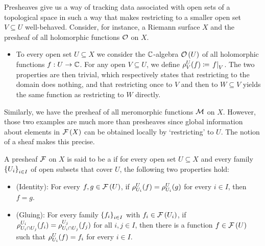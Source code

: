 \documentclass[../Moduli_Spaces_of_Riemann_Surfaces.tex]{subfiles}
\begin{document}
    \begin{remark}
        Presheaves give us a way of tracking data associated with open sets of a topological space in such a way that makes restricting to a smaller open set $V\subseteq U$ well-behaved. Consider, for instance, a Riemann surface $X$ and the presheaf of all holomorphic functions $\mathcal{O}$ on $X$.
        \begin{itemize}
            \item To every open set $U\subseteq X$ we consider the $\mathbb{C}$-algebra $\mathcal{O}\left(U\right)$ of all holomorphic functions $f:U\to\mathbb{C}$. For any open $V\subseteq U$, we define $\rho^U_V\!\left(f\right)\coloneqq\left.f\right|_V$. The two properties are then trivial, which respectively states that restricting to the domain does nothing, and that restricting once to $V$ and then to $W\subseteq V$ yields the same function as restricting to $W$ directly.
        \end{itemize}
        Similarly, we have the presheaf of all meromorphic functions $\mathcal{M}$ on $X$. However, those two examples are much more than presheaves since global information about elements in $\mathcal{F}\left(X\right)$ can be obtained locally by `restricting' to $U$. The notion of a sheaf makes this precise.\exqed
    \end{remark}
    \begin{definition}
        A presheaf $\mathcal{F}$ on $X$ is said to be a  if for every open set $U\subseteq X$ and every family $\left\{U_i\right\}_{i\in I}$ of open subsets that cover $U$, the following two properties hold:
        \begin{itemize}
            \item (Identity): For every $f,g\in\mathcal{F}\left(U\right)$, if $\rho^U_{U_i}\!\left(f\right)=\rho^U_{U_i}\!\left(g\right)$ for every $i\in I$, then $f=g$.
                \vspace{-0.05in}
            \item (Gluing): For every family $\left\{f_i\right\}_{i\in I}$ with $f_i\in\mathcal{F}\left(U_i\right)$, if $\rho^{U_i}_{U_i\cap U_j}\!\left(f_i\right)=\rho^{U_j}_{U_i\cap U_j}\!\left(f_j\right)$ for all $i,j\in I$, then there is a function $f\in\mathcal{F}\left(U\right)$ such that $\rho^U_{U_i}\!\left(f\right)=f_i$ for every $i\in I$.
        \end{itemize}
    \end{definition}
\end{document}
